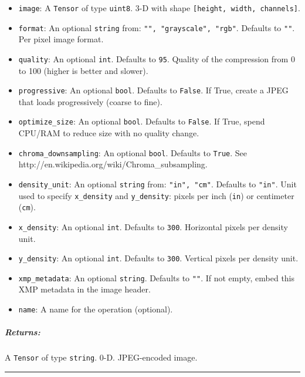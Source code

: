 \begin{itemize}
\tightlist
\item
  \texttt{image}: A \texttt{Tensor} of type \texttt{uint8}. 3-D with
  shape \texttt{{[}height,\ width,\ channels{]}}.
\item
  \texttt{format}: An optional \texttt{string} from:
  \texttt{"",\ "grayscale",\ "rgb"}. Defaults to \texttt{""}. Per pixel
  image format.
\item
  \texttt{quality}: An optional \texttt{int}. Defaults to \texttt{95}.
  Quality of the compression from 0 to 100 (higher is better and
  slower).
\item
  \texttt{progressive}: An optional \texttt{bool}. Defaults to
  \texttt{False}. If True, create a JPEG that loads progressively
  (coarse to fine).
\item
  \texttt{optimize\_size}: An optional \texttt{bool}. Defaults to
  \texttt{False}. If True, spend CPU/RAM to reduce size with no quality
  change.
\item
  \texttt{chroma\_downsampling}: An optional \texttt{bool}. Defaults to
  \texttt{True}. See http://en.wikipedia.org/wiki/Chroma\_subsampling.
\item
  \texttt{density\_unit}: An optional \texttt{string} from:
  \texttt{"in",\ "cm"}. Defaults to \texttt{"in"}. Unit used to specify
  \texttt{x\_density} and \texttt{y\_density}: pixels per inch
  (\texttt{\textquotesingle{}in\textquotesingle{}}) or centimeter
  (\texttt{\textquotesingle{}cm\textquotesingle{}}).
\item
  \texttt{x\_density}: An optional \texttt{int}. Defaults to
  \texttt{300}. Horizontal pixels per density unit.
\item
  \texttt{y\_density}: An optional \texttt{int}. Defaults to
  \texttt{300}. Vertical pixels per density unit.
\item
  \texttt{xmp\_metadata}: An optional \texttt{string}. Defaults to
  \texttt{""}. If not empty, embed this XMP metadata in the image
  header.
\item
  \texttt{name}: A name for the operation (optional).
\end{itemize}

\subparagraph{Returns: }\label{returns-1}

A \texttt{Tensor} of type \texttt{string}. 0-D. JPEG-encoded image.

\begin{center}\rule{0.5\linewidth}{\linethickness}\end{center}

